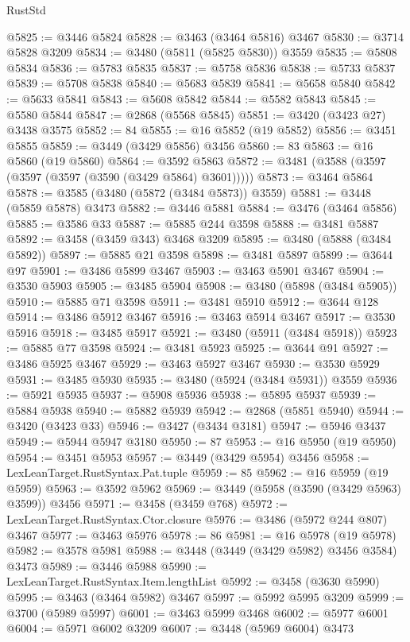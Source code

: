 \begin{lexlean}{RustStd}
\begin{coremodule}
{{{{{{{{{{{{{{{{{{{@5825 := @3446 @5824
@5828 := @3463 (@3464 @5816) @3467
@5830 := @3714 @5828 @3209
@5834 := @3480 (@5811 (@5825 @5830)) @3559
@5835 := @5808 @5834
@5836 := @5783 @5835
@5837 := @5758 @5836
@5838 := @5733 @5837
@5839 := @5708 @5838
@5840 := @5683 @5839
@5841 := @5658 @5840
@5842 := @5633 @5841
@5843 := @5608 @5842
@5844 := @5582 @5843
@5845 := @5580 @5844
@5847 := @2868 (@5568 @5845)
@5851 := @3420 (@3423 @27) @3438 @3575
@5852 := 84
@5855 := @16 @5852 (@19 @5852)
@5856 := @3451 @5855
@5859 := @3449 (@3429 @5856) @3456
@5860 := 83
@5863 := @16 @5860 (@19 @5860)
@5864 := @3592 @5863
@5872 := @3481 (@3588 (@3597 (@3597 (@3597 (@3590 (@3429 @5864) @3601)))))
@5873 := @3464 @5864
@5878 := @3585 (@3480 (@5872 (@3484 @5873)) @3559)
@5881 := @3448 (@5859 @5878) @3473
@5882 := @3446 @5881
@5884 := @3476 (@3464 @5856)
@5885 := @3586 @33
@5887 := @5885 @244 @3598
@5888 := @3481 @5887
@5892 := @3458 (@3459 @343) @3468 @3209
@5895 := @3480 (@5888 (@3484 @5892))
@5897 := @5885 @21 @3598
@5898 := @3481 @5897
@5899 := @3644 @97
@5901 := @3486 @5899 @3467
@5903 := @3463 @5901 @3467
@5904 := @3530 @5903
@5905 := @3485 @5904
@5908 := @3480 (@5898 (@3484 @5905))
@5910 := @5885 @71 @3598
@5911 := @3481 @5910
@5912 := @3644 @128
@5914 := @3486 @5912 @3467
@5916 := @3463 @5914 @3467
@5917 := @3530 @5916
@5918 := @3485 @5917
@5921 := @3480 (@5911 (@3484 @5918))
@5923 := @5885 @77 @3598
@5924 := @3481 @5923
@5925 := @3644 @91
@5927 := @3486 @5925 @3467
@5929 := @3463 @5927 @3467
@5930 := @3530 @5929
@5931 := @3485 @5930
@5935 := @3480 (@5924 (@3484 @5931)) @3559
@5936 := @5921 @5935
@5937 := @5908 @5936
@5938 := @5895 @5937
@5939 := @5884 @5938
@5940 := @5882 @5939
@5942 := @2868 (@5851 @5940)
@5944 := @3420 (@3423 @33)
@5946 := @3427 (@3434 @3181)
@5947 := @5946 @3437
@5949 := @5944 @5947 @3180
@5950 := 87
@5953 := @16 @5950 (@19 @5950)
@5954 := @3451 @5953
@5957 := @3449 (@3429 @5954) @3456
@5958 := LexLeanTarget.RustSyntax.Pat.tuple
@5959 := 85
@5962 := @16 @5959 (@19 @5959)
@5963 := @3592 @5962
@5969 := @3449 (@5958 (@3590 (@3429 @5963) @3599)) @3456
@5971 := @3458 (@3459 @768)
@5972 := LexLeanTarget.RustSyntax.Ctor.closure
@5976 := @3486 (@5972 @244 @807) @3467
@5977 := @3463 @5976
@5978 := 86
@5981 := @16 @5978 (@19 @5978)
@5982 := @3578 @5981
@5988 := @3448 (@3449 (@3429 @5982) @3456 @3584) @3473
@5989 := @3446 @5988
@5990 := LexLeanTarget.RustSyntax.Item.lengthList
@5992 := @3458 (@3630 @5990)
@5995 := @3463 (@3464 @5982) @3467
@5997 := @5992 @5995 @3209
@5999 := @3700 (@5989 @5997)
@6001 := @3463 @5999 @3468
@6002 := @5977 @6001
@6004 := @5971 @6002 @3209
@6007 := @3448 (@5969 @6004) @3473
}}}}}}}}}}}}}}}}}}}
\end{coremodule}
\end{lexlean}
